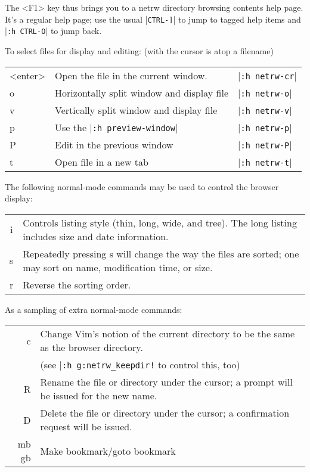 The <F1> key thus brings you to a netrw directory browsing contents help page.
It's a regular help page; use the usual |\verb!CTRL-]!| to jump to tagged help items and |\verb!:h CTRL-O!| to jump back.

To select files for display and editing: (with the cursor is atop a filename)

\begin{center} \begin{longtable}{l l l}
				<enter> & Open the file in the current window. & |\verb!:h netrw-cr!| \\
				o & Horizontally split window and display file & |\verb!:h netrw-o!| \\
				v & Vertically split window and display file & |\verb!:h netrw-v!| \\
				p & Use the |\verb!:h preview-window!| & |\verb!:h netrw-p!| \\
				P & Edit in the previous window & |\verb!:h netrw-P!| \\
				t & Open file in a new tab & |\verb!:h netrw-t!|
\end{longtable} \end{center}

The following normal-mode commands may be used to control the browser display:

\begin{center} \begin{tabularx}{\textwidth}{c X}
				i & Controls listing style (thin, long, wide, and tree).  The long listing includes size and date information. \\
				s & Repeatedly pressing s will change the way the files are sorted; one may sort on name, modification time, or size. \\
				r & Reverse the sorting order. \\

\end{tabularx} \end{center}

As a sampling of extra normal-mode commands:

\begin{center} \begin{tabularx}{\textwidth}{r X}
				c & Change Vim's notion of the current directory to be the same as the browser directory.\\
				  & (see |\texttt{:h g:netrw\_keepdir!} to control this, too) \\
				R & Rename the file or directory under the cursor; a prompt will be issued for the new name.\\
				D & Delete the file or directory under the cursor; a confirmation request will be issued.\\
				mb gb & Make bookmark/goto bookmark\\
\end{tabularx} \end{center}


